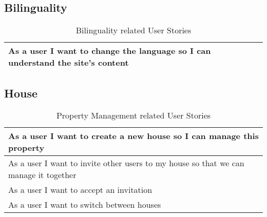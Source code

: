\subsection{Bilinguality}
\begin{table}[H]
  \begin{tabularx}{\linewidth}{|X|}
    \hline
      As a user I want to change the language so I can understand the site's content \\
     \hline
  \end{tabularx}
  \caption{Bilinguality related User Stories}
\end{table}

\subsection{House} \label{subsub:userstorieshouse}
\begin{table}[H]
  \begin{tabularx}{\linewidth}{|X|}
    \hline
      As a user I want to create a new house so I can manage this property \\
     \hline
      As a user I want to invite other users to my house so that we can manage it together \\
     \hline
      As a user I want to accept an invitation \\
     \hline
      As a user I want to switch between houses \\
     \hline 
  \end{tabularx}
  \caption{Property Management related User Stories}
\end{table}
